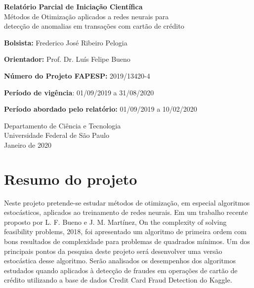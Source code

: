 \documentclass[a4paper,12pt]{article}
\begin{document}
\begin{titlepage}
   \begin{center}
       \vspace*{1cm}
 
       \Large
       \textbf{Relatório Parcial de Iniciação Científica}\\
       Métodos de Otimização aplicados a redes neurais para \\ detecção de anomalias em transações com cartão de crédito
 	   
 	   \normalsize
       \vspace{5.5cm}
        \textbf{Bolsista:} Frederico José Ribeiro Pelogia
        
       \vspace{0.5cm}
        \textbf{Orientador:} Prof. Dr. Luís Felipe Bueno
 
       \vspace{0.5cm}
 
       \textbf{Número do Projeto FAPESP:} 2019/13420-4\\
       
      \vspace{0.5cm}
      
		\textbf{Período de vigência}: 01/09/2019 a 31/08/2020    
      
      \vspace{0.5cm}
		\textbf{Período abordado pelo relatório:} 01/09/2019 a 10/02/2020
 
       \vfill

 
 
       Departamento de Ciência e Tecnologia\\
       Universidade Federal de São Paulo\\
       Janeiro de 2020
 
   \end{center}
\end{titlepage}

\section*{Resumo do projeto}
 Neste projeto pretende-se estudar métodos de otimização, em especial algoritmos estocásticos,
aplicados ao treinamento de redes neurais. Em um trabalho recente proposto por L. F. Bueno e
J. M. Martínez, On the complexity of solving feasibility problems, 2018, foi apresentado um algoritmo
de primeira ordem com bons resultados de complexidade para problemas de quadrados mínimos.
Um dos principais pontos da pesquisa deste projeto será desenvolver uma versão estocástica desse
algoritmo. Serão analisados os desempenhos dos algoritmos estudados quando aplicados à detecção
de fraudes em operações de cartão de crédito utilizando a base de dados Credit Card Fraud Detection
do Kaggle.
\end{document}
